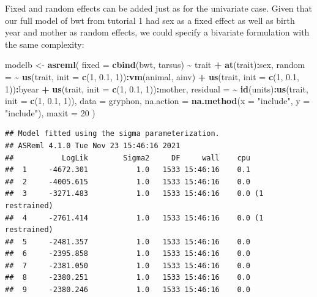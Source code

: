 \documentclass[
  12pt,
]{book}
\newenvironment{Shaded}{\begin{snugshade}}{\end{snugshade}}
\newcommand{\DataTypeTok}[1]{\textcolor[rgb]{0.13,0.29,0.53}{#1}}
\newcommand{\DecValTok}[1]{\textcolor[rgb]{0.00,0.00,0.81}{#1}}
\newcommand{\FloatTok}[1]{\textcolor[rgb]{0.00,0.00,0.81}{#1}}
\newcommand{\KeywordTok}[1]{\textcolor[rgb]{0.13,0.29,0.53}{\textbf{#1}}}
\newcommand{\NormalTok}[1]{#1}
\newcommand{\OperatorTok}[1]{\textcolor[rgb]{0.81,0.36,0.00}{\textbf{#1}}}
\newcommand{\StringTok}[1]{\textcolor[rgb]{0.31,0.60,0.02}{#1}}
\begin{document}
Fixed and random effects can be added just as for the univariate case. Given that our full model of bwt from tutorial 1 had sex as a fixed effect as well as birth year and mother as random effects, we could specify a bivariate formulation with the same complexity:

\begin{Shaded}
\begin{Highlighting}[]
\NormalTok{modelb \textless{}{-}}\StringTok{ }\KeywordTok{asreml}\NormalTok{(}
  \DataTypeTok{fixed =} \KeywordTok{cbind}\NormalTok{(bwt, tarsus) }\OperatorTok{\textasciitilde{}}\StringTok{ }\NormalTok{trait }\OperatorTok{+}\StringTok{ }\KeywordTok{at}\NormalTok{(trait)}\OperatorTok{:}\NormalTok{sex,}
  \DataTypeTok{random =} \OperatorTok{\textasciitilde{}}\StringTok{ }\KeywordTok{us}\NormalTok{(trait, }\DataTypeTok{init =} \KeywordTok{c}\NormalTok{(}\DecValTok{1}\NormalTok{, }\FloatTok{0.1}\NormalTok{, }\DecValTok{1}\NormalTok{))}\OperatorTok{:}\KeywordTok{vm}\NormalTok{(animal, ainv) }\OperatorTok{+}
\StringTok{    }\KeywordTok{us}\NormalTok{(trait, }\DataTypeTok{init =} \KeywordTok{c}\NormalTok{(}\DecValTok{1}\NormalTok{, }\FloatTok{0.1}\NormalTok{, }\DecValTok{1}\NormalTok{))}\OperatorTok{:}\NormalTok{byear }\OperatorTok{+}
\StringTok{    }\KeywordTok{us}\NormalTok{(trait, }\DataTypeTok{init =} \KeywordTok{c}\NormalTok{(}\DecValTok{1}\NormalTok{, }\FloatTok{0.1}\NormalTok{, }\DecValTok{1}\NormalTok{))}\OperatorTok{:}\NormalTok{mother,}
  \DataTypeTok{residual =} \OperatorTok{\textasciitilde{}}\StringTok{ }\KeywordTok{id}\NormalTok{(units)}\OperatorTok{:}\KeywordTok{us}\NormalTok{(trait, }\DataTypeTok{init =} \KeywordTok{c}\NormalTok{(}\DecValTok{1}\NormalTok{, }\FloatTok{0.1}\NormalTok{, }\DecValTok{1}\NormalTok{)),}
  \DataTypeTok{data =}\NormalTok{ gryphon,}
  \DataTypeTok{na.action =} \KeywordTok{na.method}\NormalTok{(}\DataTypeTok{x =} \StringTok{"include"}\NormalTok{, }\DataTypeTok{y =} \StringTok{"include"}\NormalTok{),}
  \DataTypeTok{maxit =} \DecValTok{20}
\NormalTok{)}
\end{Highlighting}
\end{Shaded}

\begin{verbatim}
## Model fitted using the sigma parameterization.
## ASReml 4.1.0 Tue Nov 23 15:46:16 2021
##           LogLik        Sigma2     DF     wall    cpu
##  1     -4672.301           1.0   1533 15:46:16    0.1
##  2     -4005.615           1.0   1533 15:46:16    0.0
##  3     -3271.483           1.0   1533 15:46:16    0.0 (1 restrained)
##  4     -2761.414           1.0   1533 15:46:16    0.0 (1 restrained)
##  5     -2481.357           1.0   1533 15:46:16    0.0
##  6     -2395.858           1.0   1533 15:46:16    0.0
##  7     -2381.050           1.0   1533 15:46:16    0.0
##  8     -2380.251           1.0   1533 15:46:16    0.0
##  9     -2380.246           1.0   1533 15:46:16    0.0
\end{verbatim}
\end{document}
